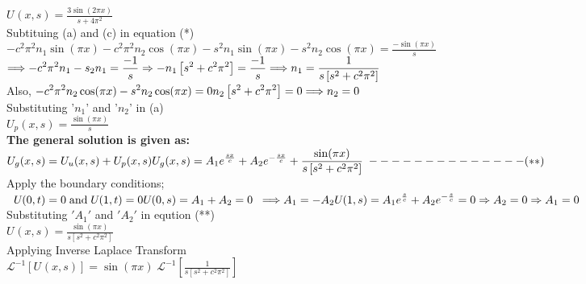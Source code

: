 \documentclass[a4paper 11pt]{article}
\newcommand{\Laplace}{\mathcal{L}}
\newcommand{\sbracket}[1]{\left[#1\right]}
\newcommand{\Un}[2]{U_{#1}(#2)}
\newcommand{\NI}{\noindent}
\newcommand{\psq}{\pi^{2}}
\newcommand{\InverseL}[1]{\Laplace^{-1}\left[#1\right]}
\begin{document}
\NI ${\displaystyle \Un{}{x,s} = \frac{3\sin(2\pi x)}{s + 4\pi^{2}}}$\\[0.5cm]

\NI Subtituing (a) and (c) in equation (*)\\
${\displaystyle -c^{2}\psq n_{1}\sin(\pi x) - c^{2}\psq n_{2}\cos(\pi x) - s^{2}n_{1}\sin(\pi x) -  s^{2}n_{2}\cos(\pi x) = \frac{-\sin(\pi x)}{s}}$\\[0.2cm]
$ \Longrightarrow \displaystyle -c^{2}\psq n_{1} - s_{2}n_{1}  = \frac{-1}{s} \Rightarrow -n_{1}\left[s^{2} + c^{2}\psq \right] = \frac{-1}{s} \\ 
\Longrightarrow n_{1} = \frac{1}{s\left[s^{2} + c^{2}\psq \right]}
$\\[0.2cm]

\NI Also, 
$
\displaystyle -c^{2}\psq n_{2}\cos(\pi x) - s^{2}n_{2}\cos(\pi x) = 0 \\[0.2cm]
n_2\left[s^{2} + c^{2}\psq \right] = 0 \\[0.2cm] 
\Longrightarrow n_{2} = 0 \\
$\\[0.2cm]

\NI Substituting '$n_{1}$' and '$n_{2}$' in (a)\\[0.2cm]
$ \displaystyle
\Un{p}{x,s} = \frac{\sin(\pi x)}{s}
$\\[0.2cm]

\NI \textbf{The general solution is given as:}\\[0.2cm]
$\displaystyle
\Un{g}{x,s} = \Un{u}{x,s} + \Un{p}{x,s} \\[0.2cm]
\Un{g}{x,s} = A_{1}e^{\frac{sx}{c}} + A_{2}e^{-\frac{sx}{c}} + \frac{\sin(\pi x)}{s\left[ s^{2} + c^{2}\psq \right]} \; - - - - - - - - - - - - - - (**)
$\\[0.2cm]

\NI Apply the boundary conditions;
$\displaystyle
\; \; \Un{}{0,t} = 0 \; \text{and} \; \Un{}{1,t} = 0 \\[0.2cm]
\Un{}{0,s} = A_1 + A_2 = 0 \; \; \Longrightarrow A_1 = - A_2 \\[0.1cm]
\Un{}{1,s} = A_1 e^{\frac{s}{c}} + A_2 e^{- \frac{s}{c}} = 0 \Rightarrow A_2 = 0 \Rightarrow A_1 = 0
$\\[0.3cm]

\NI Substituting $'A_1'$ and $'A_2'$ in eqution (**) \\[0.2cm]
$\displaystyle
\Un{}{x,s} = \frac{\sin(\pi x)}{s \left[s^{2} + c^{2}\psq \right]}
$\\[1cm]

\NI Applying Inverse Laplace Transform \\[0.2cm]
$\displaystyle
\InverseL{\Un{}{x,s}} = \sin(\pi x) \; \InverseL{\frac{1}{s\sbracket{s^{2} + c^{2}\psq}}}
$\\[0.3cm]
\end{document}
